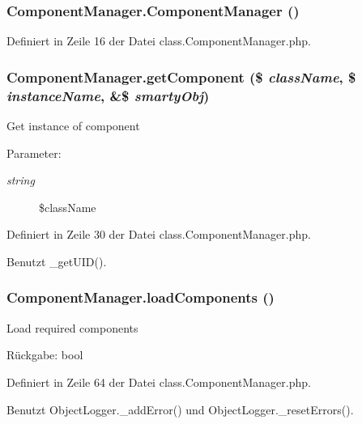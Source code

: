 \subsubsection{\setlength{\rightskip}{0pt plus 5cm}ComponentManager.ComponentManager ()}\label{classComponentManager_03aadeb58f4514bf579786ed60f36c0e}




Definiert in Zeile 16 der Datei class.ComponentManager.php.
\subsubsection{\setlength{\rightskip}{0pt plus 5cm}ComponentManager.getComponent (\$ {\em className}, \$ {\em instanceName}, \&\$ {\em smartyObj})}\label{classComponentManager_ad16dcb2419e0e7c3004693064aaf62f}


Get instance of component

\begin{Desc}
\item[Parameter:]
\begin{description}
\item[{\em string}]\$className \end{description}
\end{Desc}


Definiert in Zeile 30 der Datei class.ComponentManager.php.

Benutzt \_\-getUID().
\subsubsection{\setlength{\rightskip}{0pt plus 5cm}ComponentManager.loadComponents ()}\label{classComponentManager_7b007b47d8301ba0df504d5cd4589544}


Load required components

\begin{Desc}
\item[Rückgabe:]bool \end{Desc}


Definiert in Zeile 64 der Datei class.ComponentManager.php.

Benutzt ObjectLogger.\_\-addError() und ObjectLogger.\_\-resetErrors().
